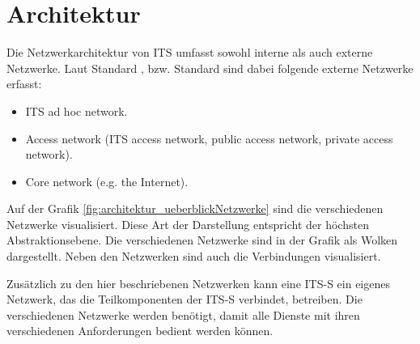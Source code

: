 \chapter{Architektur  \label{chap_archtitektur}}
Die Netzwerkarchitektur von \ac{ITS} umfasst sowohl interne als auch externe Netzwerke. Laut Standard \cite{etsi302636-3}, bzw. Standard \cite{etsi102636-3} sind dabei folgende externe Netzwerke erfasst:

\begin{itemize}
 	\item ITS ad hoc network.
	\item Access network (ITS access network, public access network, private access network).
	\item Core network (e.g. the Internet).
\end{itemize}

Auf der Grafik \ref{fig:architektur_ueberblickNetzwerke} sind die verschiedenen Netzwerke visualisiert. Diese Art der Darstellung entspricht der höchsten Abstraktionsebene. Die verschiedenen Netzwerke sind in der Grafik als Wolken dargestellt. Neben den Netzwerken sind auch die Verbindungen visualisiert.


Zusätzlich zu den hier beschriebenen Netzwerken kann eine \ac{ITS-S} ein eigenes Netzwerk, das die Teilkomponenten der \ac{ITS-S} verbindet, betreiben. Die verschiedenen Netzwerke werden benötigt, damit alle Dienste mit ihren verschiedenen Anforderungen bedient werden können.

